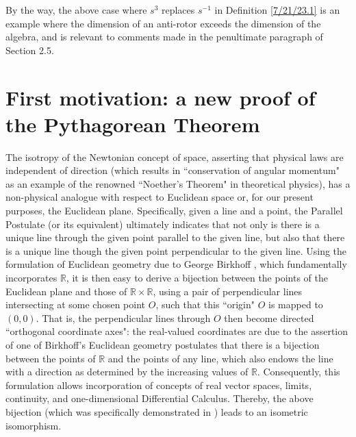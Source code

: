 \documentclass{amsart}
\numberwithin{equation}{section}
\theoremstyle{definition}
\numberwithin{theorem}{section}
\begin{document}
 By the way, the above case where $s^3$ replaces $s^{-1}$ in Definition \ref{7/21/23.1} is an example where the dimension of an anti-rotor exceeds the dimension of the algebra, and is relevant to comments made in the penultimate paragraph of Section 2.5.

\vspace{.5cm}

\appendix

 \section{First motivation: a  new proof of the Pythagorean Theorem}    The isotropy of the Newtonian concept of space, asserting that physical laws are independent of direction (which results in ``conservation of angular momentum" as an example of the renowned ``Noether's Theorem" in theoretical physics), has a non-physical analogue with respect to Euclidean space or, for our present purposes, the Euclidean plane.  Specifically, given a line and a point, the Parallel Postulate (or its equivalent) ultimately indicates that not only is there is a unique line through the given point parallel to the given line, but also that there is a unique line though the given point perpendicular to the given line.  Using the formulation of Euclidean geometry due to George Birkhoff \cite{birkhoff:1932}, which fundamentally incorporates $\mathbb{R}$, it is then easy to derive a bijection between the points of the Euclidean plane and those of $\mathbb{R}\times\mathbb{R}$, using a pair of perpendicular lines intersecting at some chosen point $O$, such that this ``origin" $O$ is mapped to $(0,0)$.  That is, the perpendicular lines through $O$ then become directed ``orthogonal coordinate axes": the real-valued coordinates are due to the assertion of one of Birkhoff's Euclidean geometry postulates that there is a bijection between the points of $\mathbb{R}$ and the points of any line, which also endows the line with a direction as determined by the increasing values of $\mathbb{R}$.  Consequently, this formulation allows incorporation of concepts of real vector spaces, limits, continuity, and one-dimensional Differential Calculus.  Thereby, the above bijection (which was specifically demonstrated in \cite{birkhoff:1932}) leads to an isometric isomorphism. 
\end{document}
